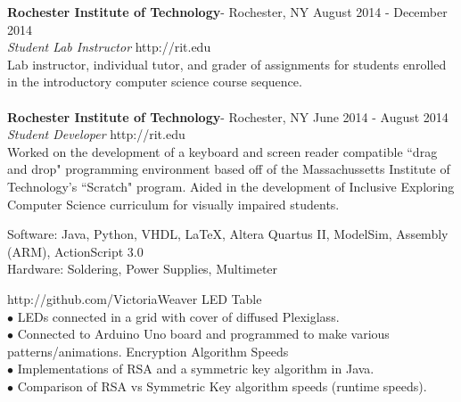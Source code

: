 \documentclass[10pt]{article} %
\begin{document}
{
\newline
	\textbf{Rochester Institute of Technology}- Rochester, NY 		\hfill August 2014 - December 2014
	\\ \textit{Student Lab Instructor}								\hfill http://rit.edu
	\\ \indent Lab instructor, individual tutor, and grader of assignments for students enrolled in the introductory computer science course sequence.   
	\\	
	\\ \textbf{Rochester Institute of Technology}- Rochester, NY 	\hfill June 2014 - August 2014
	\\ \textit{Student Developer}									\hfill http://rit.edu
	\\ \indent Worked on the development of a keyboard and screen reader compatible ``drag and drop" programming environment based off of the Massachussetts Institute of Technology's ``Scratch" program.  Aided in the development of Inclusive Exploring Computer Science curriculum for visually impaired students.


\bigskip


\newline
	Software: Java, Python, VHDL, \LaTeX, Altera Quartus II, ModelSim, Assembly (ARM), ActionScript 3.0 
	\\ Hardware: Soldering, Power Supplies, Multimeter

\bigskip


	\hfill http://github.com/VictoriaWeaver
\newline
	LED Table
		\\ \indent $\bullet$ LEDs connected in a grid with cover of diffused Plexiglass.  
		\\ \indent $\bullet$ Connected to  Arduino Uno board and programmed to make various patterns/animations.
\newline
	Encryption Algorithm Speeds
		\\ \indent $\bullet$ Implementations of RSA and a symmetric key algorithm in Java.
		\\ \indent $\bullet$ Comparison of RSA vs Symmetric Key algorithm speeds (runtime speeds).

}
\end{document}
